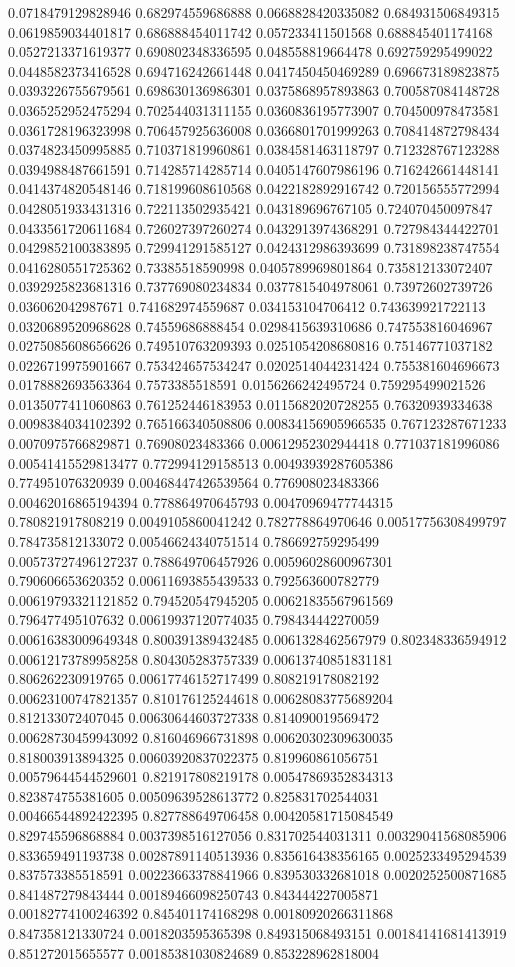 \begin{table}
\begin{tabu}
\begin{sparkline}{10}
0.0718479129828946 0.682974559686888 0.0668828420335082 0.684931506849315 0.0619859034401817 0.686888454011742 0.057233411501568 0.688845401174168 0.0527213371619377 0.690802348336595 0.048558819664478 0.692759295499022 0.0448582373416528 0.694716242661448 0.0417450450469289 0.696673189823875 0.0393226755679561 0.698630136986301 0.0375868957893863 0.700587084148728 0.0365252952475294 0.702544031311155 0.0360836195773907 0.704500978473581 0.0361728196323998 0.706457925636008 0.0366801701999263 0.708414872798434 0.0374823450995885 0.710371819960861 0.0384581463118797 0.712328767123288 0.0394988487661591 0.714285714285714 0.0405147607986196 0.716242661448141 0.0414374820548146 0.718199608610568 0.0422182892916742 0.720156555772994 0.0428051933431316 0.722113502935421 0.043189696767105 0.724070450097847 0.0433561720611684 0.726027397260274 0.0432913974368291 0.727984344422701 0.0429852100383895 0.729941291585127 0.0424312986393699 0.731898238747554 0.0416280551725362 0.73385518590998 0.0405789969801864 0.735812133072407 0.0392925823681316 0.737769080234834 0.0377815404978061 0.73972602739726 0.036062042987671 0.741682974559687 0.034153104706412 0.743639921722113 0.0320689520968628 0.74559686888454 0.0298415639310686 0.747553816046967 0.0275085608656626 0.749510763209393 0.0251054208680816 0.75146771037182 0.0226719975901667 0.753424657534247 0.0202514044231424 0.755381604696673 0.0178882693563364 0.7573385518591 0.0156266242495724 0.759295499021526 0.0135077411060863 0.761252446183953 0.0115682020728255 0.76320939334638 0.0098384034102392 0.765166340508806 0.00834156905966535 0.767123287671233 0.0070975766829871 0.76908023483366 0.00612952302944418 0.771037181996086 0.00541415529813477 0.772994129158513 0.00493939287605386 0.774951076320939 0.00468447426539564 0.776908023483366 0.00462016865194394 0.778864970645793 0.00470969477744315 0.780821917808219 0.0049105860041242 0.782778864970646 0.00517756308499797 0.784735812133072 0.00546624340751514 0.786692759295499 0.00573727496127237 0.788649706457926 0.00596028600967301 0.790606653620352 0.00611693855439533 0.792563600782779 0.00619793321121852 0.794520547945205 0.00621835567961569 0.796477495107632 0.00619937120774035 0.798434442270059 0.00616383009649348 0.800391389432485 0.0061328462567979 0.802348336594912 0.00612173789958258 0.804305283757339 0.00613740851831181 0.806262230919765 0.00617746152717499 0.808219178082192 0.00623100747821357 0.810176125244618 0.00628083775689204 0.812133072407045 0.00630644603727338 0.814090019569472 0.00628730459943092 0.816046966731898 0.00620302309630035 0.818003913894325 0.00603920837022375 0.819960861056751 0.00579644544529601 0.821917808219178 0.00547869352834313 0.823874755381605 0.00509639528613772 0.825831702544031 0.00466544892422395 0.827788649706458 0.00420581715084549 0.829745596868884 0.0037398516127056 0.831702544031311 0.00329041568085906 0.833659491193738 0.00287891140513936 0.835616438356165 0.0025233495294539 0.837573385518591 0.00223663378841966 0.839530332681018 0.0020252500871685 0.841487279843444 0.00189466098250743 0.843444227005871 0.00182774100246392 0.845401174168298 0.00180920266311868 0.847358121330724 0.0018203595365398 0.849315068493151 0.00184141681413919 0.851272015655577 0.00185381030824689 0.853228962818004 
\end{sparkline}
\end{tabu}
\end{table}
